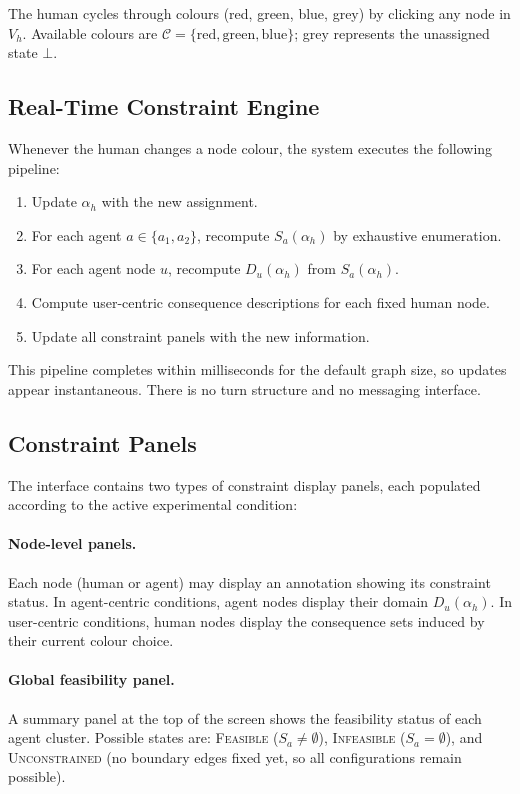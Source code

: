 \documentclass[10pt]{article}
\theoremstyle{definition}
\begin{document}
The human cycles through colours (red, green, blue, grey) by clicking any node in $V_h$.
Available colours are $\mathcal{C} = \{\text{red}, \text{green}, \text{blue}\}$; grey represents
the unassigned state $\bot$.

\subsection{Real-Time Constraint Engine}

Whenever the human changes a node colour, the system executes the following pipeline:
\begin{enumerate}
  \item Update $\alpha_h$ with the new assignment.
  \item For each agent $a \in \{a_1, a_2\}$, recompute $S_a(\alpha_h)$ by exhaustive enumeration.
  \item For each agent node $u$, recompute $D_u(\alpha_h)$ from $S_a(\alpha_h)$.
  \item Compute user-centric consequence descriptions for each fixed human node.
  \item Update all constraint panels with the new information.
\end{enumerate}
This pipeline completes within milliseconds for the default graph size, so updates appear
instantaneous.  There is no turn structure and no messaging interface.

\subsection{Constraint Panels}

The interface contains two types of constraint display panels, each populated according to the
active experimental condition:

\paragraph{Node-level panels.}
Each node (human or agent) may display an annotation showing its constraint status.  In
agent-centric conditions, agent nodes display their domain $D_u(\alpha_h)$.  In user-centric
conditions, human nodes display the consequence sets induced by their current colour choice.

\paragraph{Global feasibility panel.}
A summary panel at the top of the screen shows the feasibility status of each agent cluster.
Possible states are: \textsc{Feasible} ($S_a \neq \emptyset$), \textsc{Infeasible}
($S_a = \emptyset$), and \textsc{Unconstrained} (no boundary edges fixed yet, so all
configurations remain possible).
\end{document}
